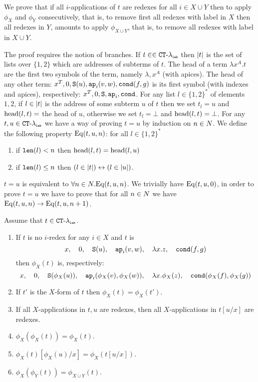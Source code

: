 We prove that if all $i$-applications of $t$ are redexes for all $i \in X \cup Y$
then to apply $\phi_X$ and $\phi_Y$ consecutively, that is, to remove first all redexes with label in $X$
then all redexes in $Y$, amounts to apply $\phi_{X \cup Y}$,  that is, to remove 
all redexes with label in $X \cup Y$.

The proof requires the notion of branches. If $t \in \in { { {\tt CT} \mbox{-} \lambda} _ {\mbox{\tiny \tt lab}} }$ then ${|t|}$
is the set of lists over $\{1,2\}$ which are addresses of subterms of $t$. The head of a term
$\lambda x^A.t$ are the first two symbols of the term, namely $\lambda, x^A$ (with apices). 
The head of any other term:
$x^T,0,{\tt S}(u),{\tt ap}_i(v,w),{\tt cond}(f,g)$ is its first symbol (with indexes and apices), respectively: 
$x^T,0,{\tt S},{\tt ap}_i,{\tt cond}$. For any list $l \in \{1,2\}^*$ of elements $1,2$, 
if $l \in {|t|}$ is the address of some subterm $u$ of $t$ then we set $t_l = u$ 
and ${\rm head}(l,t) = $ the head of $u$,
otherwise we set $t_l = \bot$ and  ${\rm head}(l,t) = \bot$.
For any $t,u \in { { {\tt CT} \mbox{-} \lambda} _ {\mbox{\tiny \tt lab}} }$ we have a way of proving $t = u$ by induction on $n \in {N}$.
We define the following property ${\rm Eq}(t,u,n)$: for all $l \in \{1,2\}^*$
\begin{enumerate}
\item
 if  ${\tt len}(l)<n$ then ${\rm head}(l,t) = {\rm head}(l,u)$ 
\item
 if ${\tt len}(l) \le n$ then $(l \in {|t|}) \leftrightarrow (l \in {|u|})$.
\end{enumerate}
$t = u$ is equivalent to $\forall n \in {N}.{\rm Eq}(t,u,n)$.
We trivially have ${\rm Eq}(t,u,0)$, in order to prove $t=u$ we have to prove that for all $n \in {N}$ we have
${\rm Eq}(t,u,n) \rightarrow {\rm Eq}(t,u,n+1)$.


\begin{lemma}
Assume that $t \in { { {\tt CT} \mbox{-} \lambda} _ {\mbox{\tiny \tt lab}} }$. 
\begin{enumerate}

\item
If $t$ is no $i$-redex for any $i \in X$ and $t$ is
$$ 
x, \ \ \  
0, \ \ \  
{\tt S}(u),  \ \ \  
{\tt ap}_i(v,w), \ \ \  
\lambda x.z, \ \ \  
{\tt cond}(f,g)
$$
then $\phi_X(t)$ is, respectively:
$$ 
x, \ \ \  
0, \ \ \  
{\tt S}(\phi_X(u)),  \ \ \  
{\tt ap}_i(\phi_X(v),\phi_X(w)), \ \ \  
\lambda x.\phi_X(z), \ \ \  
{\tt cond}(\phi_X(f),\phi_X(g))
$$

\item
If $t'$ is the $X$-form of $t$ then $\phi_X(t) = \phi_X(t')$.

\item
If all $X$-applications in $t,u$ are redexes, then all $X$-applications in $t[u/x]$ are redexes.

\item
$\phi_{X}(\phi_{X}(t)) = \phi_{X}(t)$.

\item
$\phi_{X}(t)[\phi_{X}(u)/x]= \phi_{X}(t[u/x])$.

\item
$\phi_{X}(\phi_{Y}(t)) = \phi_{X \cup Y}(t)$.

\end{enumerate}
\end{lemma}


